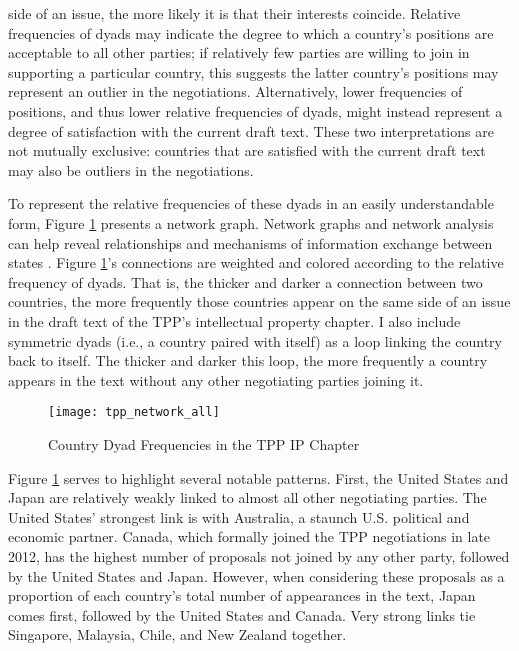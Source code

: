 \documentclass[12pt]{article}
\begin{document}
side of an issue, the more likely it is that their interests coincide. Relative frequencies of 
dyads may indicate the degree to which a country's positions are acceptable to all other parties; if relatively 
few parties are willing to join in supporting a particular country, this suggests the latter country's 
positions may represent an outlier in the negotiations. Alternatively, lower frequencies of positions, 
and thus lower relative frequencies of dyads, might instead represent a degree of satisfaction with 
the current draft text. These two interpretations are not mutually exclusive: countries that are 
satisfied with the current draft text may also be outliers in the negotiations.

To represent the relative frequencies of these dyads in an easily understandable form, 
Figure \ref{fig_tpp_network_graph} presents a network graph. Network graphs and network analysis can help reveal relationships and mechanisms of information exchange between states \citep{kinne2013network}.
Figure \ref{fig_tpp_network_graph}'s connections are weighted and colored 
according to the relative frequency of dyads. That is, the thicker and darker a connection between 
two countries, the more frequently those countries appear on the same side of an issue in the draft 
text of the TPP's intellectual property chapter. I also include symmetric dyads (i.e., a country paired with itself) as a loop linking the country back to itself. The thicker and darker this loop, the more frequently a country appears in 
the text without any other negotiating parties joining it.

\begin{figure}
\caption{Country Dyad Frequencies in the TPP IP Chapter}
\label{fig_tpp_network_graph}
\centering
\texttt{[image: tpp\_network\_all]}
\end{figure}

Figure \ref{fig_tpp_network_graph} serves to highlight several notable patterns. First, the 
United States and Japan are relatively 
weakly linked to almost all other negotiating parties. The United States' strongest link is with 
Australia, a staunch U.S. political and economic partner. Canada, which formally joined the TPP 
negotiations in late 2012, has the highest number of proposals not joined by any other party, followed 
by the United States and Japan. However, when considering these proposals as a proportion of each 
country's total number of appearances in the text, Japan comes first, followed by the United States 
and Canada. Very strong links tie Singapore, Malaysia, Chile, and New Zealand together.
\end{document}
